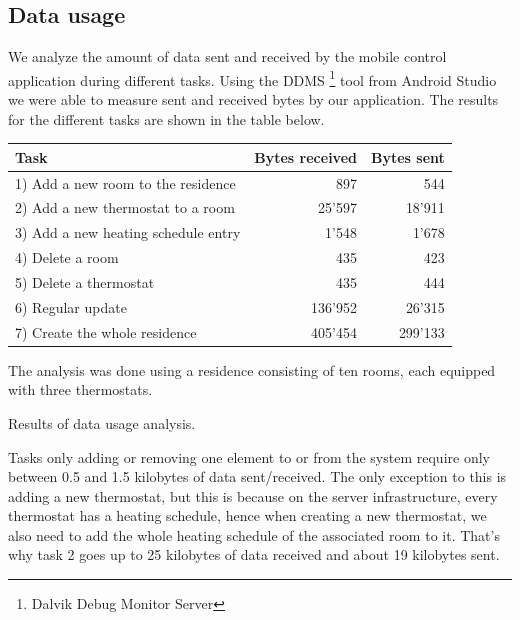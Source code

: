 \subsection{Data usage}
\label{sec:data_usage}
We analyze the amount of data sent and received by the mobile control application during different tasks. Using the DDMS \footnote{Dalvik Debug Monitor Server} tool from Android Studio we were able to measure sent and received bytes by our application. The results for the different tasks are shown in the table below. \\

\begin{threeparttable}[htbp]
	\centering
	\begin{tabular}{ l | r r }
		\toprule
		Task	& Bytes received	& Bytes sent \\
		\midrule
		1) Add a new room to the residence				& 897		& 544 \\
		2) Add a new thermostat to a room				& 25'597		& 18'911 \\
		3) Add a new heating schedule entry				& 1'548		& 1'678 \\
		4) Delete a room							& 435		& 423 \\
		5) Delete a thermostat						& 435		& 444 \\
		6) Regular update\tnote{\textdagger}								& 136'952		& 26'315 \\
		7) Create the whole residence\tnote{\textdagger}					& 405'454  	& 299'133\\
		\bottomrule
	\end{tabular}
	\begin{tablenotes}
		\footnotesize{
			\item[\textdagger] The analysis was done using a residence consisting of ten rooms, each equipped with three thermostats.
		}
	\end{tablenotes}
	\caption{Results of data usage analysis.}
	\label{table:data_usage}
\end{threeparttable}

Tasks only adding or removing one element to or from the system require only between 0.5 and 1.5 kilobytes of data sent/received. The only exception to this is adding a new thermostat, but this is because on the server infrastructure, every thermostat has a heating schedule, hence when creating a new thermostat, we also need to add the whole heating schedule of the associated room to it. That's why task 2 goes up to 25 kilobytes of data received and about 19 kilobytes sent. 

